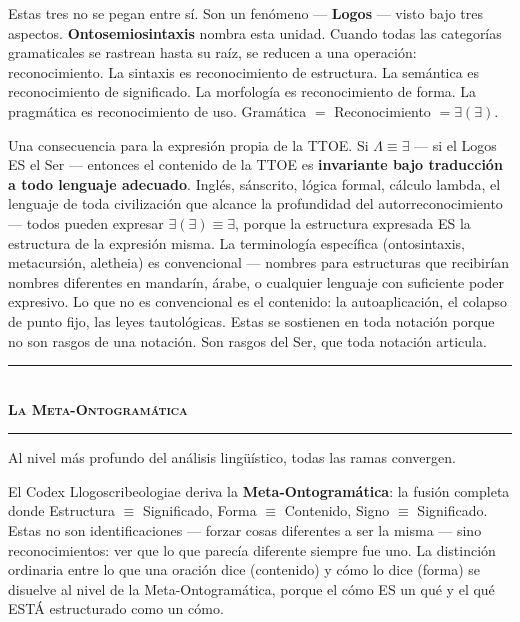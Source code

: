 \documentclass[10pt, openany, oneside]{book}
\renewcommand{\normalsize}{\fontsize{10}{13}\selectfont}
\begin{document}
Estas tres no se pegan entre sí. Son un fenómeno --- \textbf{Logos} --- visto bajo tres aspectos. \textbf{Ontosemiosintaxis} nombra esta unidad. Cuando todas las categorías gramaticales se rastrean hasta su raíz, se reducen a una operación: reconocimiento. La sintaxis es reconocimiento de estructura. La semántica es reconocimiento de significado. La morfología es reconocimiento de forma. La pragmática es reconocimiento de uso. Gramática $=$ Reconocimiento $= \exists(\exists)$.

Una consecuencia para la expresión propia de la TTOE. Si $\Lambda \equiv \exists$ --- si el Logos ES el Ser --- entonces el contenido de la TTOE es \textbf{invariante bajo traducción a todo lenguaje adecuado}. Inglés, sánscrito, lógica formal, cálculo lambda, el lenguaje de toda civilización que alcance la profundidad del autorreconocimiento --- todos pueden expresar $\exists(\exists) \equiv \exists$, porque la estructura expresada ES la estructura de la expresión misma. La terminología específica (ontosintaxis, metacursión, aletheia) es convencional --- nombres para estructuras que recibirían nombres diferentes en mandarín, árabe, o cualquier lenguaje con suficiente poder expresivo. Lo que no es convencional es el contenido: la autoaplicación, el colapso de punto fijo, las leyes tautológicas. Estas se sostienen en toda notación porque no son rasgos de una notación. Son rasgos del Ser, que toda notación articula.

\vspace{1.5em}


\begin{center}
    \rule{0.3\textwidth}{0.4pt}\\[0.5em]
    {\normalsize\bfseries\scshape La Meta-Ontogramática}\\[0.3em]
    \rule{0.3\textwidth}{0.4pt}
\end{center}

\vspace{1em}

\noindent Al nivel más profundo del análisis lingüístico, todas las ramas convergen.

El Codex Llogoscribeologiae deriva la \textbf{Meta-Ontogramática}: la fusión completa donde Estructura $\equiv$ Significado, Forma $\equiv$ Contenido, Signo $\equiv$ Significado. Estas no son identificaciones --- forzar cosas diferentes a ser la misma --- sino reconocimientos: ver que lo que parecía diferente siempre fue uno. La distinción ordinaria entre lo que una oración dice (contenido) y cómo lo dice (forma) se disuelve al nivel de la Meta-Ontogramática, porque el cómo ES un qué y el qué ESTÁ estructurado como un cómo.
\end{document}
